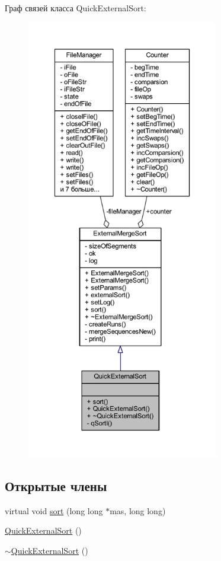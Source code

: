 Граф связей класса Quick\+External\+Sort\+:\nopagebreak
\begin{figure}[H]
\begin{center}
\leavevmode
\includegraphics[height=550pt]{class_quick_external_sort__coll__graph}
\end{center}
\end{figure}
\subsection*{Открытые члены}
\begin{DoxyCompactItemize}
\item 
virtual void \hyperlink{class_quick_external_sort_adafdd4faded04218c1a131bf55e3c90d}{sort} (long long $\ast$mas, long long)
\item 
\hyperlink{class_quick_external_sort_ac31914e67af41c48b8fdcbcc076168ed}{Quick\+External\+Sort} ()
\item 
\hyperlink{class_quick_external_sort_a370e2be5e7c4afc31f9b230c2ee4d689}{$\sim$\+Quick\+External\+Sort} ()
\end{DoxyCompactItemize}
